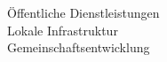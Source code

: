 \documentclass[preview]{standalone}
\begin{document}
Öffentliche Dienstleistungen\\Lokale Infrastruktur\\Gemeinschaftsentwicklung\\
\end{document}

